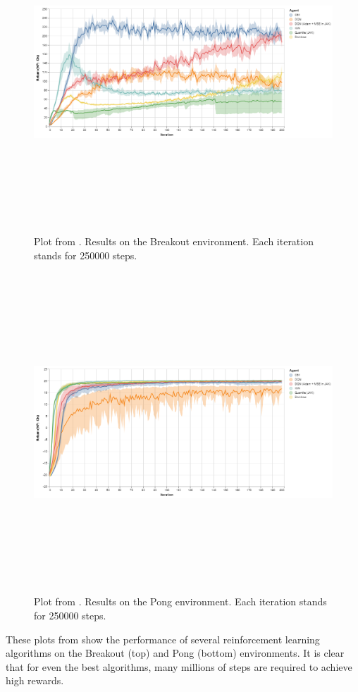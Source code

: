 \documentclass{article}
\begin{document}
\begin{figure}[H]
    \centering
    \includegraphics[width=12cm,height=12cm,keepaspectratio]{img/download.png}
\caption{Plot from \cite{plots}. Results on the Breakout environment. Each iteration stands for 250000 steps.}
\end{figure}
\begin{figure}[H]
    \centering
    \includegraphics[width=12cm,height=12cm,keepaspectratio]{img/pong2.png}
\caption{Plot from \cite{plots}. Results on the Pong environment. Each iteration stands for 250000 steps.}
\end{figure}
These plots from \cite{plots} show the performance of several reinforcement learning algorithms on the Breakout (top) and Pong (bottom) environments. It is clear that for even the best algorithms, many millions of steps are required to achieve high rewards. 
\end{document}
